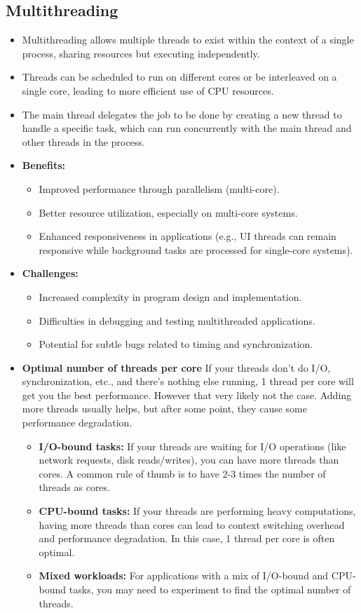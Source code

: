 \documentclass{article}
\begin{document}
\subsection{Multithreading}
\begin{itemize}
  \item Multithreading allows multiple threads to exist within the context of a single process, sharing resources but executing independently.
  \item Threads can be scheduled to run on different cores or be interleaved on a single core, leading to more efficient use of CPU resources.
  \item The main thread delegates the job to be done by creating a new thread to handle a specific task, which can run concurrently with the main thread and other threads in the process.
  \item \textbf{Benefits:}
  \begin{itemize}
    \item Improved performance through parallelism (multi-core).
    \item Better resource utilization, especially on multi-core systems.
    \item Enhanced responsiveness in applications (e.g., UI threads can remain responsive while background tasks are processed for single-core systems).
  \end{itemize}
  \item \textbf{Challenges:}
  \begin{itemize}
    \item Increased complexity in program design and implementation.
    \item Difficulties in debugging and testing multithreaded applications.
    \item Potential for subtle bugs related to timing and synchronization.
  \end{itemize}
  \item \textbf{Optimal number of threads per core}
If your threads don't do I/O, synchronization, etc., and there's nothing else running, 1 thread per core will get you the best performance. However that very likely not the case. Adding more threads usually helps, but after some point, they cause some performance degradation.
  \begin{itemize}
    \item \textbf{I/O-bound tasks:} If your threads are waiting for I/O operations (like network requests, disk reads/writes), you can have more threads than cores. A common rule of thumb is to have 2-3 times the number of threads as cores.
    \item \textbf{CPU-bound tasks:} If your threads are performing heavy computations, having more threads than cores can lead to context switching overhead and performance degradation. In this case, 1 thread per core is often optimal.
    \item \textbf{Mixed workloads:} For applications with a mix of I/O-bound and CPU-bound tasks, you may need to experiment to find the optimal number of threads.
  \end{itemize}
\end{itemize}
\end{document}
